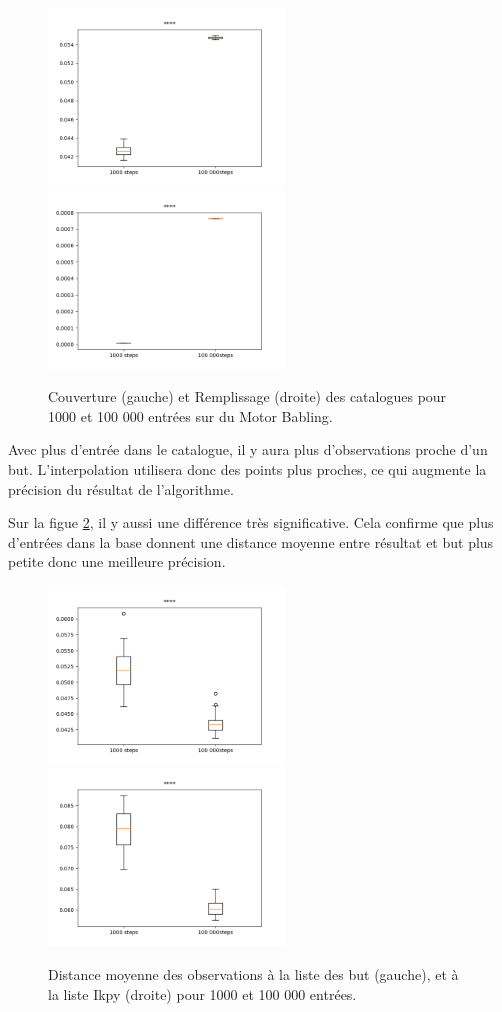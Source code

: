 \documentclass[11pt,french]{report}
\begin{document}
\begin{figure}[h]
    \centering
    \includegraphics[width=178pt]{1mb_1k-100kstep_couver.png} \includegraphics[width=178pt]{1mb_1k-100kstep_rempli.png}
    \caption{Couverture (gauche) et Remplissage (droite) des catalogues pour 1000 et 100 000 entrées sur du Motor Babling.}
    \label{fig:MB_couv_remp}
\end{figure}

Avec plus d'entrée dans le catalogue, il y aura plus d'observations proche d'un but. L'interpolation utilisera donc des points plus proches, ce qui augmente la précision du résultat de l'algorithme.

Sur la figue \ref{fig:MB_dis_moy}, il y aussi une différence très significative. Cela confirme que plus d'entrées dans la base donnent une distance moyenne entre résultat et but plus petite donc une meilleure précision.

\begin{figure}[h]
    \centering
    \includegraphics[width=178pt]{1mb_1k-100kstep_moy_ik.png} \includegraphics[width=178pt]{1mb_1k-100kstep_moy_gl.png}
    \caption{Distance moyenne des observations à la liste des but (gauche), et à la liste Ikpy (droite) pour 1000 et 100 000 entrées.}
    \label{fig:MB_dis_moy}
\end{figure}
\end{document}
